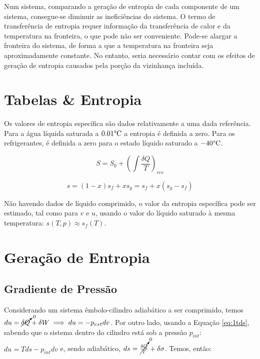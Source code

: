 Num sistema, comparando a geração de entropia de cada componente de um sistema, consegue-se diminuir as ineficiências do sistema. O termo de transferência de entropia requer informação da transferência de calor e da temperatura na fronteira, o que pode não ser conveniente. Pode-se alargar a fronteira do sistema, de forma a que a temperatura na fronteira seja aproximadamente constante. No entanto, seria necessário contar com os efeitos de geração de entropia causados pela porção da vizinhança incluída. 


\section{Tabelas \& Entropia}

Os valores de entropia específica são dados relativamente a uma dada referência. Para a água líquida saturada a $0.01 \text{\textdegree C}$ a entropia é definida a zero. Para os refrigerantes, é definida a zero para o estado líquido saturado a $-40 \text{\textdegree C}$.

\begin{equation}
    S = S_0 + \left( \int \frac{\delta Q}{T} \right)_{rev}
\end{equation}

\begin{equation*}
    s = (1-x) s_f + x s_g = s_f + x (s_g - s_f)
\end{equation*}

Não havendo dados de líquido comprimido, o valor da entropia específica pode ser estimado, tal como para $v$ e $u$, usando o valor do líquido saturado à mesma temperatura: $s(T,p) \approx s_f(T)$.


\section{Geração de Entropia}

\subsection{Gradiente de Pressão}

Considerando um sistema êmbolo-cilindro adiabático a ser comprimido, temos \newline $du = \cancelto{0}{\delta Q} + \delta W \implies du = - p_{ext} dv$. Por outro lado, usando a Equação \ref{eq:1tds}, sabendo que o sistema dentro do cilindro está sob a pressão $p_{int}$: $du = T ds - p_{int} dv$ e, sendo adiabático, $ds = \cancelto{0}{\frac{\delta Q}{T}} + \delta \sigma$. Temos, então:

